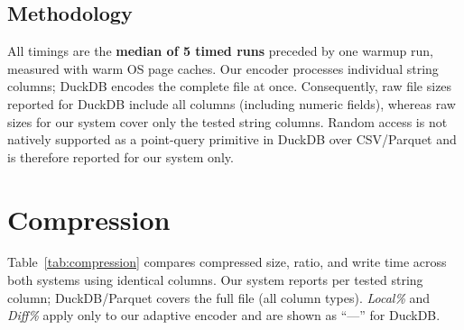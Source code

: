 \documentclass[a4paper,11pt]{article}
\begin{document}
\subsection{Methodology}

All timings are the \textbf{median of 5 timed runs} preceded by one warmup
run, measured with warm OS page caches.
Our encoder processes individual string columns; DuckDB encodes the complete
file at once. Consequently, raw file sizes reported for DuckDB include all
columns (including numeric fields), whereas raw sizes for our system cover
only the tested string columns. Random access is not natively supported
as a point-query primitive in DuckDB over CSV/Parquet and is therefore
reported for our system only.

\newpage
\section{Compression}

Table~\ref{tab:compression} compares compressed size, ratio, and write
time across both systems using identical columns. Our system reports
per tested string column; DuckDB/Parquet covers the full file (all column
types). \emph{Local\%} and \emph{Diff\%} apply only to our adaptive encoder
and are shown as ``---'' for DuckDB.
\end{document}
